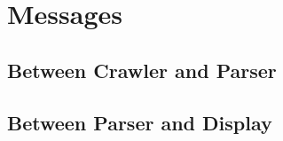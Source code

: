 \section{Messages}


\subsection{Between Crawler and Parser}


\subsection{Between Parser and Display}


